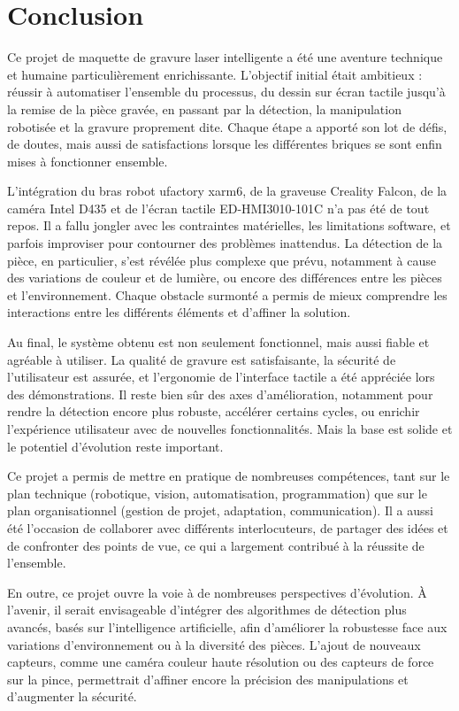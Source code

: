 \chapter{Conclusion}

Ce projet de maquette de gravure laser intelligente a été une aventure technique et humaine particulièrement enrichissante. L'objectif initial était ambitieux : réussir à automatiser l'ensemble du processus, du dessin sur écran tactile jusqu'à la remise de la pièce gravée, en passant par la détection, la manipulation robotisée et la gravure proprement dite. Chaque étape a apporté son lot de défis, de doutes, mais aussi de satisfactions lorsque les différentes briques se sont enfin mises à fonctionner ensemble.

L'intégration du bras robot \gls{ufactory} \gls{xarm6}, de la graveuse Creality Falcon, de la caméra Intel D435 et de l'écran tactile \gls{ED-HMI3010-101C} n'a pas été de tout repos. Il a fallu jongler avec les contraintes matérielles, les limitations \gls{software}, et parfois improviser pour contourner des problèmes inattendus. La détection de la pièce, en particulier, s'est révélée plus complexe que prévu, notamment à cause des variations de couleur et de lumière, ou encore des différences entre les pièces et l'environnement. Chaque obstacle surmonté a permis de mieux comprendre les interactions entre les différents éléments et d'affiner la solution.

Au final, le système obtenu est non seulement fonctionnel, mais aussi fiable et agréable à utiliser. La qualité de gravure est satisfaisante, la sécurité de l'utilisateur est assurée, et l'ergonomie de l'interface tactile a été appréciée lors des démonstrations. Il reste bien sûr des axes d'amélioration, notamment pour rendre la détection encore plus robuste, accélérer certains cycles, ou enrichir l'expérience utilisateur avec de nouvelles fonctionnalités. Mais la base est solide et le potentiel d’évolution reste important.

Ce projet a permis de mettre en pratique de nombreuses compétences, tant sur le plan technique (robotique, vision, automatisation, programmation) que sur le plan organisationnel (gestion de projet, adaptation, communication). Il a aussi été l'occasion de collaborer avec différents interlocuteurs, de partager des idées et de confronter des points de vue, ce qui a largement contribué à la réussite de l'ensemble.

En outre, ce projet ouvre la voie à de nombreuses perspectives d’évolution. À l’avenir, il serait envisageable d’intégrer des algorithmes de détection plus avancés, basés sur l’intelligence artificielle, afin d’améliorer la robustesse face aux variations d’environnement ou à la diversité des pièces. L’ajout de nouveaux capteurs, comme une caméra couleur haute résolution ou des capteurs de force sur la pince, permettrait d’affiner encore la précision des manipulations et d’augmenter la sécurité.

